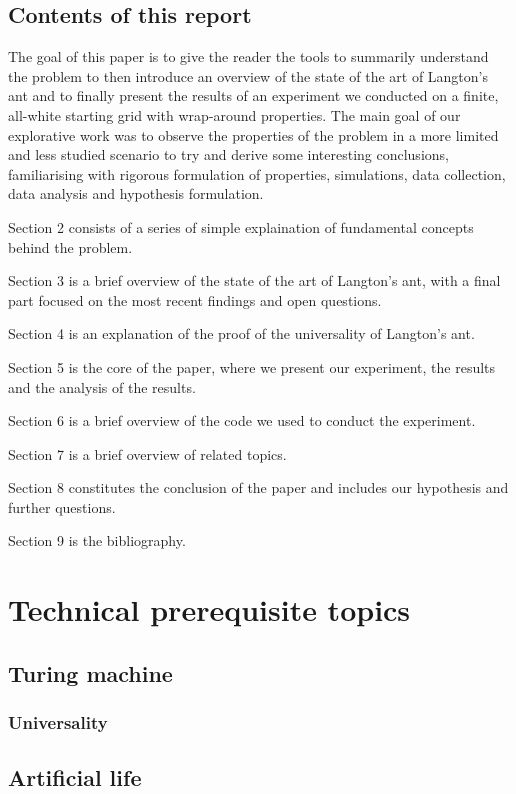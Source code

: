 \documentclass{article}
\begin{document}
\newpage

\subsection{Contents of this report}
The goal of this paper is to give the reader the tools to summarily understand the problem to then introduce an overview of the state of the art 
of Langton's ant and to finally present the results of an experiment we conducted on a finite, all-white starting grid with wrap-around properties.
The main goal of our explorative work was to observe the properties of the problem in a more limited and less studied scenario to try and derive some interesting
conclusions, familiarising with rigorous formulation of properties, simulations, data collection, data analysis and hypothesis formulation.

Section 2 consists of a series of simple explaination of fundamental concepts behind the problem.

Section 3 is a brief overview of the state of the art of Langton's ant, with a final part focused on the most recent findings and open questions.

Section 4 is an explanation of the proof of the universality of Langton's ant.

Section 5 is the core of the paper, where we present our experiment, the results and the analysis of the results.

Section 6 is a brief overview of the code we used to conduct the experiment.

Section 7 is a brief overview of related topics.

Section 8 constitutes the conclusion of the paper and includes our hypothesis and further questions.

Section 9 is the bibliography.

\section{Technical prerequisite topics}
\subsection{Turing machine}
\subsubsection{Universality}
\subsection{Artificial life}
\end{document}
